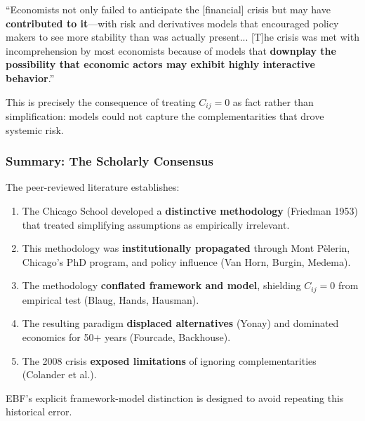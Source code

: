 \begin{tcolorbox}[colback=red!5!white, colframe=red!75!black,
    title=\textbf{Colander et al.\ (2009): Systemic Failure}]

``Economists not only failed to anticipate the [financial] crisis but may have
\textbf{contributed to it}---with risk and derivatives models that encouraged
policy makers to see more stability than was actually present... [T]he crisis
was met with incomprehension by most economists because of models that
\textbf{downplay the possibility that economic actors may exhibit highly
interactive behavior}.'' \citep{colander2009crisis}

\end{tcolorbox}

This is precisely the consequence of treating $C_{ij} = 0$ as fact rather than
simplification: models could not capture the complementarities that drove
systemic risk.

\subsubsection{Summary: The Scholarly Consensus}

The peer-reviewed literature establishes:

\begin{enumerate}[nosep]
    \item The Chicago School developed a \textbf{distinctive methodology} (Friedman 1953)
        that treated simplifying assumptions as empirically irrelevant.
    \item This methodology was \textbf{institutionally propagated} through Mont P\`{e}lerin,
        Chicago's PhD program, and policy influence (Van Horn, Burgin, Medema).
    \item The methodology \textbf{conflated framework and model}, shielding $C_{ij} = 0$
        from empirical test (Blaug, Hands, Hausman).
    \item The resulting paradigm \textbf{displaced alternatives} (Yonay) and dominated
        economics for 50+ years (Fourcade, Backhouse).
    \item The 2008 crisis \textbf{exposed limitations} of ignoring complementarities
        (Colander et al.).
\end{enumerate}

EBF's explicit framework-model distinction is designed to avoid repeating this
historical error.




